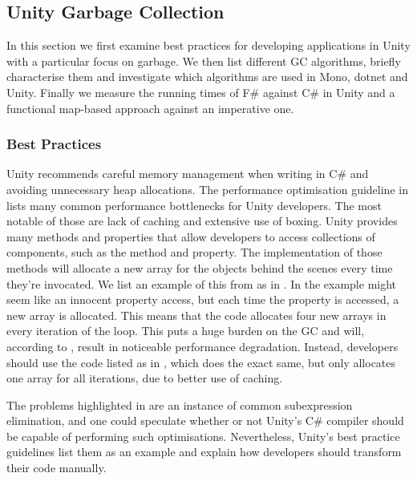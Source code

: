 \subsection{Unity Garbage Collection}
In this section we first examine best practices for developing applications in Unity with a particular focus on garbage. We then list different \gls{GC} algorithms, briefly characterise them and investigate which algorithms are used in Mono, dotnet and Unity. Finally we measure the running times of F\# against C\# in Unity and a functional map-based approach against an imperative one.

\subsubsection{Best Practices}
Unity recommends careful memory management when writing in C\# and avoiding unnecessary heap allocations\cite{unity:optimisation}. The performance optimisation guideline in \cite{unity:optimisation} lists many common performance bottlenecks for Unity developers. The most notable of those are lack of caching and extensive use of boxing. Unity provides many methods and properties that allow developers to access collections of components, such as the  method and  property\cite{unity:optimisation, unity:heap}. The implementation of those methods will allocate a new array for the objects behind the scenes every time they're invocated. We list an example of this from \cite{unity:heap} as  in . In the example  might seem like an innocent property access, but each time the property is accessed, a new array is allocated. This means that the code allocates four new arrays in every iteration of the loop. This puts a huge burden on the \gls{GC} and will, according to \cite{unity:heap}, result in noticeable performance degradation. Instead, developers should use the code listed as  in , which does the exact same, but only allocates one array for all iterations, due to better use of caching.

The problems highlighted in  are an instance of common subexpression elimination, and one could speculate whether or not Unity's C\# compiler should be capable of performing such optimisations. Nevertheless, Unity's best practice guidelines list them as an example and explain how developers should transform their code manually\cite{unity:heap}.

